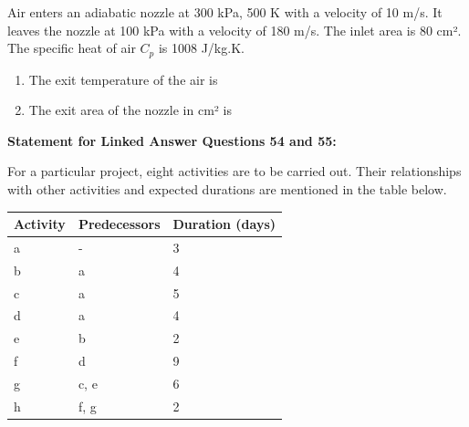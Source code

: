 \documentclass[journal,12pt,onecolumn]{IEEEtran}
\begin{document}
Air enters an adiabatic nozzle at 300 kPa, 500 K with a velocity of 10 m/s. It leaves the nozzle at 100 kPa with a velocity of 180 m/s. The inlet area is 80 cm². The specific heat of air \(C_p\) is 1008 J/kg.K.

\begin{enumerate}[resume]

    \item The exit temperature of the air is

          \begin{enumerate}
          \end{enumerate}

    \item The exit area of the nozzle in cm² is

          \begin{enumerate}
          \end{enumerate}

\end{enumerate}

\normalsize\textbf{Statement for Linked Answer Questions 54 and 55:}

For a particular project, eight activities are to be carried out. Their relationships with other activities and expected durations are mentioned in the table below.

\begin{table}[H]
    \centering
    \begin{tabular}{|l|l|l|}
        \hline
        Activity & Predecessors & Duration (days) \\
        \hline
        a        & -            & 3               \\
        b        & a            & 4               \\
        c        & a            & 5               \\
        d        & a            & 4               \\
        e        & b            & 2               \\
        f        & d            & 9               \\
        g        & c, e         & 6               \\
        h        & f, g         & 2               \\
        \hline
    \end{tabular}
\end{table}
\end{document}
